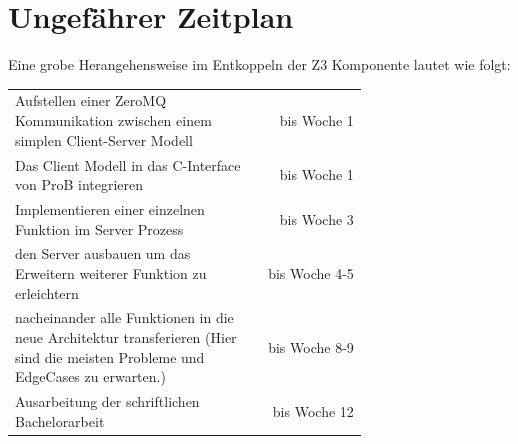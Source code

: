 \documentclass[11pt,a4paper]{scrartcl}
\begin{document}
\section{Ungefährer Zeitplan}
Eine grobe Herangehensweise im Entkoppeln der Z3 Komponente lautet wie folgt:

\begin{table}[!htp]
    \begin{tabular}{p{0.7\linewidth}r}
        Aufstellen einer ZeroMQ Kommunikation zwischen einem simplen Client-Server Modell                                                       & bis Woche 1    \\
        Das Client Modell in das C-Interface von ProB integrieren                                                                               & bis Woche 1    \\
        Implementieren einer einzelnen Funktion im Server Prozess                                                                               & bis Woche 3    \\
        den Server ausbauen um das Erweitern weiterer Funktion zu erleichtern                                                                   & bis Woche 4-5  \\
        nacheinander alle Funktionen in die neue Architektur transferieren \newline (Hier sind die meisten Probleme und EdgeCases zu erwarten.) & bis Woche 8-9 \\
        Ausarbeitung der schriftlichen Bachelorarbeit                                                                                           & bis Woche 12   \\
    \end{tabular}
\end{table}
\FloatBarrier


\newpage
\printbibliography
\end{document}
